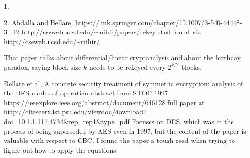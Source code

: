1.

2. Abdalla and Bellare,
\url{https://link.springer.com/chapter/10.1007/3-540-44448-3_42}
\url{http://cseweb.ucsd.edu/~mihir/papers/rekey.html}
found via
\url{http://cseweb.ucsd.edu/~mihir/}

That paper talks about differential/linear cryptanalysis and about the
birthday paradox, saying block size $k$ needs to be rekeyed every
$2^{k/2}$ blocks.

Bellare et al, A concrete security treatment of symmetric encryption:
analysis of the DES modes of operation
abstract from STOC 1997
https://ieeexplore.ieee.org/abstract/document/646128
full paper at
\url{http://citeseerx.ist.psu.edu/viewdoc/download?doi=10.1.1.117.4734&rep=rep1&type=pdf}
Focuses on DES, which was in the process of being superseded by AES
even in 1997, but the content of the paper is valuable with respect to
CBC.  I found the paper a tough read when trying to figure out how to
apply the equations.

